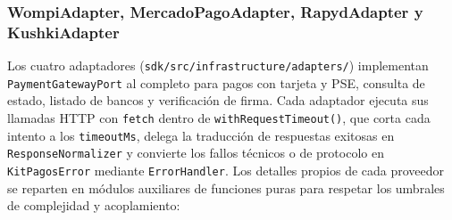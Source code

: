 \subsubsection{WompiAdapter, MercadoPagoAdapter, RapydAdapter y KushkiAdapter}
Los cuatro adaptadores (\texttt{sdk/src/infrastructure/adapters/}) implementan \texttt{PaymentGatewayPort} al completo para pagos con tarjeta y PSE, consulta de estado, listado de bancos y verificación de firma. Cada adaptador ejecuta sus llamadas HTTP con \texttt{fetch} dentro de \texttt{withRequestTimeout()}, que corta cada intento a los \texttt{timeoutMs}, delega la traducción de respuestas exitosas en \texttt{ResponseNormalizer} y convierte los fallos técnicos o de protocolo en \texttt{KitPagosError} mediante \texttt{ErrorHandler}. Los detalles propios de cada proveedor se reparten en módulos auxiliares de funciones puras para respetar los umbrales de complejidad y acoplamiento:
